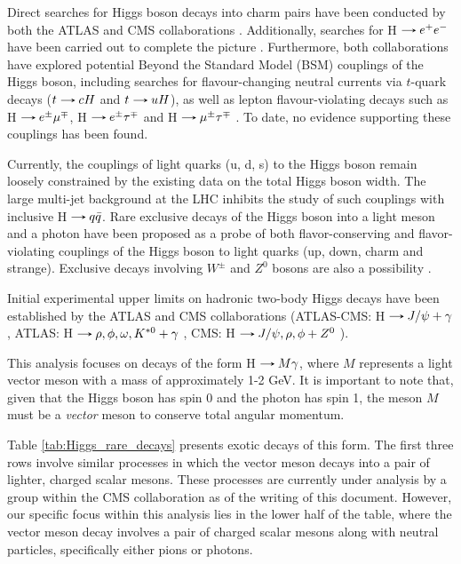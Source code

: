 Direct searches for Higgs boson decays into charm pairs have been conducted by both the ATLAS and CMS collaborations . Additionally, searches for H$\decaysto e^+e^-$ have been carried out to complete the picture . Furthermore, both collaborations have explored potential Beyond the Standard Model (BSM) couplings of the Higgs boson, including searches for flavour-changing neutral currents via $t$-quark decays ($t\decaysto cH$ and $t\decaysto uH$), as well as lepton flavour-violating decays such as H$\decaysto e^\pm\mu^\mp$, H$\decaysto e^\pm\tau^\mp$ and H$\decaysto \mu^\pm\tau^\mp$ . To date, no evidence supporting these couplings has been found.

Currently, the couplings of light quarks (u, d, s) to the Higgs boson remain loosely constrained by the existing data on the total Higgs boson width. The large multi-jet background at the LHC inhibits the study of such couplings with inclusive H$\decaysto q\bar{q}$. Rare exclusive decays of the Higgs boson into a light meson and a photon have been proposed as a probe of both flavor-conserving and flavor-violating couplings of the Higgs boson to light quarks (up, down, charm and strange). Exclusive decays involving $W^\pm$ and $Z^0$ bosons are also a possibility \cite{Kagan:2014ila}.

Initial experimental upper limits on hadronic two-body Higgs decays have been established by the ATLAS and CMS collaborations (ATLAS-CMS: H$\decaysto J/\psi + \gamma$ \cite{ATLAS:2022rej, CMS:2018gcm}, ATLAS: H$\decaysto \rho,\phi,\omega,K^{*0} + \gamma$ \cite{ATLAS:2017gko, ATLAS:2023alf}, CMS: H$\decaysto J/\psi,\rho,\phi + Z^0$ \cite{CMS:2022fsq, CMS:2020ggo}).

This analysis focuses on decays of the form H$\decaysto M\gamma$, where $M$ represents a light vector meson with a mass of approximately 1-2 GeV. It is important to note that, given that the Higgs boson has spin 0 and the photon has spin 1, the meson $M$ must be a \textit{vector} meson to conserve total angular momentum.

Table \ref{tab:Higgs_rare_decays} presents exotic decays of this form. The first three rows involve similar processes in which the vector meson decays into a pair of lighter, charged scalar mesons. These processes are currently under analysis by a group within the CMS collaboration as of the writing of this document. However, our specific focus within this analysis lies in the lower half of the table, where the vector meson decay involves a pair of charged scalar mesons along with neutral particles, specifically either pions or photons.

